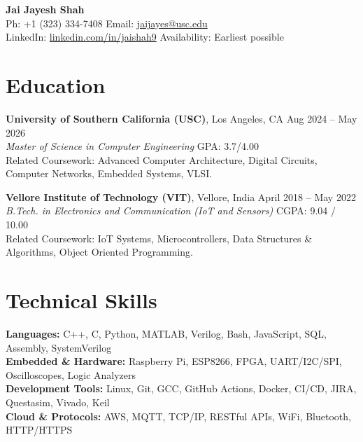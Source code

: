 \documentclass[letterpaper,10pt]{article}
\begin{document}
\begin{center}
    {\LARGE \textbf{Jai Jayesh Shah}} \\
    \vspace{2pt}
    \small
    Ph: +1 (323) 334-7408 \quad Email: \href{mailto:jaijayes@usc.edu}{jaijayes@usc.edu} \\
    LinkedIn: \href{https://www.linkedin.com/in/jaishah9}{linkedin.com/in/jaishah9} \quad Availability: Earliest possible \\
    \vspace{-8pt}
\end{center}

\section*{Education}
\textbf{University of Southern California (USC)}, Los Angeles, CA \hfill Aug 2024 -- May 2026 \\
\textit{Master of Science in Computer Engineering} \hfill GPA: 3.7/4.00 \\
Related Coursework: Advanced Computer Architecture, Digital Circuits, Computer Networks, Embedded Systems, VLSI.

\vspace{1pt}

\textbf{Vellore Institute of Technology (VIT)}, Vellore, India \hfill April 2018 -- May 2022 \\
\textit{B.Tech. in Electronics and Communication (IoT and Sensors)} \hfill CGPA: 9.04 / 10.00 \\
Related Coursework: IoT Systems, Microcontrollers, Data Structures \& Algorithms, Object Oriented Programming.

\section*{Technical Skills}
\textbf{Languages:} C++, C, Python, MATLAB, Verilog, Bash, JavaScript, SQL, Assembly, SystemVerilog \\
\textbf{Embedded \& Hardware:} Raspberry Pi, ESP8266, FPGA, UART/I2C/SPI, Oscilloscopes, Logic Analyzers \\
\textbf{Development Tools:} Linux, Git, GCC, GitHub Actions, Docker, CI/CD, JIRA, Questasim, Vivado, Keil \\
\textbf{Cloud \& Protocols:} AWS, MQTT, TCP/IP, RESTful APIs, WiFi, Bluetooth, HTTP/HTTPS
\end{document}
